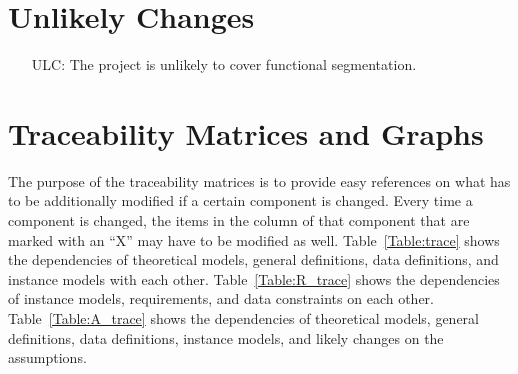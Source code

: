 \documentclass[12pt]{article}
\newcounter{lcnum} %
\newcounter{ulcnum} %
\begin{document}
\section{Unlikely Changes}

\noindent \begin{itemize}

  \item[ULC\refstepcounter{ulcnum}\theulcnum\label{ULC1}:] The project is unlikely to cover
        functional segmentation.

\end{itemize}

\section{Traceability Matrices and Graphs}

The purpose of the traceability matrices is to provide easy references on what
has to be additionally modified if a certain component is changed.  Every time a
component is changed, the items in the column of that component that are marked
with an ``X'' may have to be modified as well.  Table~\ref{Table:trace} shows the
dependencies of theoretical models, general definitions, data definitions, and
instance models with each other. Table~\ref{Table:R_trace} shows the
dependencies of instance models, requirements, and data constraints on each
other. Table~\ref{Table:A_trace} shows the dependencies of theoretical models,
general definitions, data definitions, instance models, and likely changes on
the assumptions.
\end{document}
